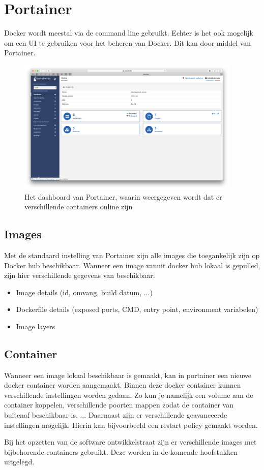\chapter{Portainer}
Docker wordt meestal via de command line gebruikt. Echter is het ook mogelijk om een UI te gebruiken voor het beheren van Docker. Dit kan door middel van Portainer.

\begin{figure}[H]
	\centering
	\includegraphics[width=0.95\textwidth]{img/PortainerDashboard.png}
	\caption{Het dashboard van Portainer, waarin weergegeven wordt dat er verschillende containers online zijn}
	\label{fig:PortainerDashboard}
\end{figure}

\section{Images}
Met de standaard instelling van Portainer zijn alle images die toegankelijk zijn op Docker hub beschikbaar. Wanneer een image vanuit docker hub lokaal is gepulled, zijn hier verschillende gegevens van beschikbaar: 
\begin{itemize}
	\setlength\itemsep{0em}
	\item Image details (id, omvang, build datum, ...)
	\item Dockerfile details (exposed ports, CMD, entry point, environment variabelen)
	\item Image layers
\end{itemize}

\section{Container}
Wanneer een image lokaal beschikbaar is gemaakt, kan in portainer een nieuwe docker container worden aangemaakt. Binnen deze docker container kunnen verschillende instellingen worden gedaan. Zo kun je namelijk een volume aan de container koppelen, verschillende poorten mappen zodat de container van buitenaf beschikbaar is, ... 
Daarnaast zijn er verschillende geavanceerde instellingen mogelijk. Hierin kan bijvoorbeeld een restart policy gemaakt worden. 

Bij het opzetten van de software ontwikkelstraat zijn er verschillende images met bijbehorende containers gebruikt. Deze worden in de komende hoofstukken uitgelegd.


